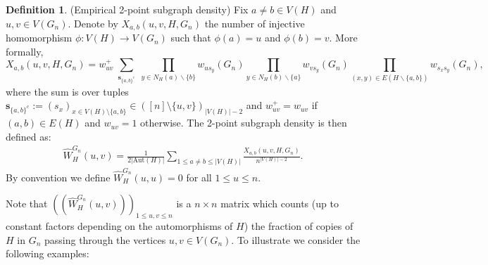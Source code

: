 \documentclass[11pt,reqno]{amsart}
\numberwithin{equation}{section}
\theoremstyle{definition}
\newtheorem{definition}{Definition}[section]
\begin{document}
\begin{definition}\label{def:Xabuv} (Empirical 2-point subgraph density) Fix $a \ne b \in V(H)$ and $u, v \in V(G_n)$. Denote by $X_{a, b}(u, v, H, G_n)$  the number of injective homomorphism $\phi: V(H) \rightarrow V(G_n)$ such that $\phi(a)=u$ and $\phi(b) = v$. More formally, 
$$X_{a, b}(u, v, H, G_n)= w_{uv}^+ \sum_{\substack{\bm s_{\{a, b\}^c}}}  \prod_{y \in N_H(a) \backslash\{b\}} w_{ u s_y}(G_n) \prod_{y \in N_H(b) \backslash\{a\}} w_{ v s_y}(G_n) \prod_{(x, y) \in E(H\backslash \{a, b\})} w_{s_x s_y}(G_n),$$
where the sum is over tuples $\bm s_{\{a, b\}^c} := (s_x)_{x\in V(H)\setminus \{a, b\} } \in ([n]\setminus \{ u, v \})_{|V(H)|-2}$ and $w_{uv}^+ = w_{uv}$ if $(a, b) \in E(H)$ and $w_{uv} = 1$ otherwise. The 2-point subgraph density is then defined as: 
\begin{align}\label{eq:WGnuv}
\hat W^{G_n}_{H}(u, v) = \frac{1}{2 |\mathrm{Aut}(H)|} \sum_{ 1 \leq a \ne b \leq |V(H)|} \frac{ X_{a, b}(u, v, H, G_n) }{ n^{|V(H)| - 2} } . 
\end{align}
By convention we define $\hat W^{G_n}_{H}(u,u) = 0$ for all $1\leq u\leq n$.
\end{definition} 

Note that $((\hat W^{G_n}_{H}(u, v)))_{1 \leq u, v \leq n}$ is a $n \times n$ matrix which counts (up to constant factors depending on the automorphisms of $H$) the fraction of copies of $H$ in $G_n$ passing through the vertices $u, v \in V(G_n)$.  To illustrate we consider the following examples: 
\end{document}
